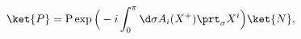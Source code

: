 \begin{equation}
\ket{P}=\mbox{P}
\exp\Big(-i\int_0^\pi \d \sigma A_i(X^+)\prt_\sigma X^i\Big)\ket{N},
\label{P>}
\end{equation}

